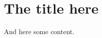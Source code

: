\documentclass[a4paper,12pt]{scrartcl}
\begin{document}
\raggedbottom

\section*{The title here}

And here some content.
\end{document}
